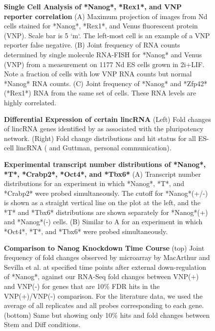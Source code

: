 \documentclass[aps,prl,twocolumn,superscriptaddress]{revtex4}
\begin{document}
\begin{figure}[H]
\begin{center}

\caption{\label{FIG:fishrexvnp} \textbf{Single Cell Analysis of *Nanog*, *Rex1*, and VNP reporter correlation}
  (A) Maximum projection of images from Nd cells stained for *Nanog*, *Rex1*, and Venus fluorescent protein (VNP). Scale bar is 5 `\mu m`. The left-most cell is an example of a VNP reporter false negative. (B) Joint frequency of RNA counts determined by single molecule RNA-FISH for *Nanog* and Venus (VNP) from a measurement on 1177 Nd ES cells grown in 2i+LIF. Note a fraction of cells with low VNP RNA counts but normal *Nanog* RNA counts. (C) Joint frequency of *Nanog* and *Zfp42* (*Rex1*) RNA from the same set of cells. These RNA levels are highly correlated. 
}
\end{center}
\end{figure}

\begin{figure}[H]
\begin{center}

\caption{\label{FIG:speciallincs} 
\textbf{Differential Expression of certain lincRNA}
(Left) Fold changes of lincRNA genes identified by \citet{GuttmanNature11} as associated with the pluripotency network. (Right) Fold change distributions and hit status for all ES-cell lincRNA (\citet{GuttmanNature11} and Guttman, personal communication).
}
\end{center}
\end{figure}


\begin{figure}[H]
\begin{center}

\caption{\label{FIG:fishThresholds} \textbf{Experimental transcript number distributions of *Nanog*, *T*, *Crabp2*, *Oct4*, and *Tbx6*} 
(A) Transcript number distributions for an experiment in which *Nanog*, *T*, and *Crabp2* were probed simultaneously. The cutoff for *Nanog*(+/-) is shown as a straight vertical line on the plot at the left, and the *T* and *Tbx6* distributions are shown separately for *Nanog*(+) and *Nanog*(-) cells.
(B) Similar to A for an experiment in which *Oct4*, *T*, and *Tbx6* were probed simultaneously.
}
\end{center}
\end{figure}



\begin{figure}[H]
\begin{center}

\caption{\label{FIG:mac} \textbf{Comparison to Nanog Knockdown Time Course}
(top) Joint frequency of fold changes observed by microarray by MacArthur and Sevilla et al. at specified time points after external down-regulation of *Nanog*, against our RNA-Seq fold changes between VNP(+) and VNP(-) for genes that are 10\% FDR hits in the VNP(+)/VNP(-) comparison. For the literature data, we used the average of all replicates and all probes corresponding to each gene. (bottom) Same but showing only 10\% hits and fold changes between Stem and Diff conditions.
}
\end{center}
\end{figure}
\end{document}
